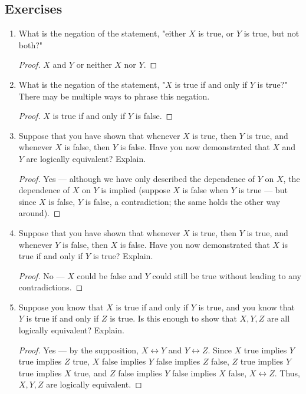\documentclass[../main.tex]{subfiles}
\begin{document}
\subsection*{Exercises}
\begin{enumerate}[ref={\thesection.\arabic*}]
    \item \label{exr:A.1.1}What is the negation of the statement, "either $X$ is true, or $Y$ is true, but not both?"
    \begin{proof}
        $X$ and $Y$ or neither $X$ nor $Y$.
    \end{proof}
    \item \label{exr:A.1.2}What is the negation of the statement, "$X$ is true if and only if $Y$ is true?" There may be multiple ways to phrase this negation.
    \begin{proof}
        $X$ is true if and only if $Y$ is false.
    \end{proof}
    \item \label{exr:A.1.3}Suppose that you have shown that whenever $X$ is true, then $Y$ is true, and whenever $X$ is false, then $Y$ is false. Have you now demonstrated that $X$ and $Y$ are logically equivalent? Explain.
    \begin{proof}
        Yes --- although we have only described the dependence of $Y$ on $X$, the dependence of $X$ on $Y$ is implied (suppose $X$ is false when $Y$ is true --- but since $X$ is false, $Y$ is false, a contradiction; the same holds the other way around).
    \end{proof}
    \item \label{exr:A.1.4}Suppose that you have shown that whenever $X$ is true, then $Y$ is true, and whenever $Y$ is false, then $X$ is false. Have you now demonstrated that $X$ is true if and only if $Y$ is true? Explain.
    \begin{proof}
        No --- $X$ could be false and $Y$ could still be true without leading to any contradictions.
    \end{proof}
    \item \label{exr:A.1.5}Suppose you know that $X$ is true if and only if $Y$ is true, and you know that $Y$ is true if and only if $Z$ is true. Is this enough to show that $X,Y,Z$ are all logically equivalent? Explain.
    \begin{proof}
        Yes --- by the supposition, $X\leftrightarrow Y$ and $Y\leftrightarrow Z$. Since $X$ true implies $Y$ true implies $Z$ true, $X$ false implies $Y$ false implies $Z$ false, $Z$ true implies $Y$ true implies $X$ true, and $Z$ false implies $Y$ false implies $X$ false, $X\leftrightarrow Z$. Thus, $X,Y,Z$ are logically equivalent.

\end{proof}
\end{enumerate}
\end{document}
